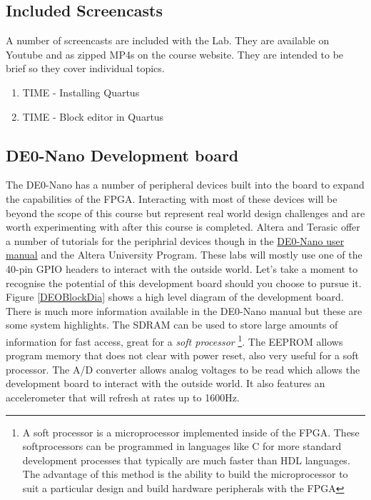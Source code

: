     \subsection{Included Screencasts}
      A number of screencasts are included with the Lab. They are available on Youtube and as zipped MP4s on the course website. They are intended to be brief so they cover individual topics.
      \begin{enumerate}
        \item TIME - Installing Quartus
        \item TIME - Block editor in Quartus
      \end{enumerate}

    \subsection{DE0-Nano Development board}
      The DE0-Nano has a number of peripheral devices built into the board to expand the capabilities of the FPGA. Interacting with most of these devices will be beyond the scope of this course but represent real world design challenges and are worth experimenting with after this course is completed. Altera and Terasic offer a number of tutorials for the periphrial devices though in the \href{http://www.terasic.com.tw/cgi-bin/page/archive_download.pl?Language=English&No=593&FID=75023fa36c9bf8639384f942e65a46f3}{DE0-Nano user manual} and the Altera University Program. These labs will mostly use one of the 40-pin GPIO headers to interact with the outside world. Let's take a moment to recognise the potential of this development board should you choose to pursue it. Figure \ref{DEOBlockDia} shows a high level diagram of the development board. There is much more information available in the DE0-Nano manual but these are some system highlights. The SDRAM can be used to store large amounts of information for fast access, great for a {\it soft processor} \footnote{A soft processor is a microprocessor implemented inside of the FPGA. These softprocessors can be programmed in languages like C for more standard development processes that typically are much faster than HDL languages. The advantage of this method is the ability to build the microprocessor to suit a particular design and build hardware peripherals with the FPGA}. The EEPROM allows program memory that does not clear with power reset, also very useful for a soft processor. The A/D converter allows analog voltages to be read which allows the development board to interact with the outside world. It also features an accelerometer that will refresh at rates up to 1600Hz.      
